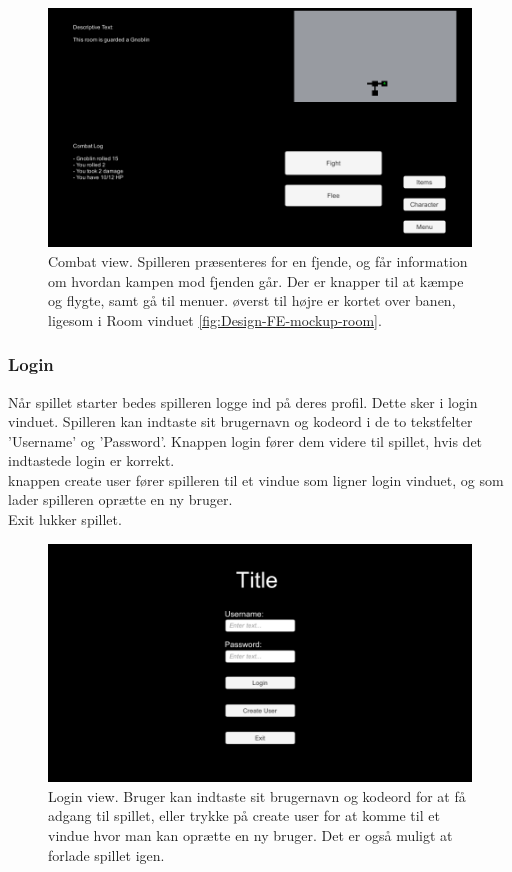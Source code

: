\begin{figure}[h]
\centering
\includegraphics[width = \textwidth]{02-Body/Images/CombatMockup.PNG}
\caption{Combat view. Spilleren præsenteres for en fjende, og får information om hvordan kampen mod fjenden går. Der er knapper til at kæmpe og flygte, samt gå til menuer. øverst til højre er kortet over banen, ligesom i Room vinduet \autoref{fig:Design-FE-mockup-room}.}
\label{fig:Design-FE-mockup-combat}
\end{figure}


\subsubsection{Login}

Når spillet starter bedes spilleren logge ind på deres profil. Dette sker i login vinduet. Spilleren kan indtaste sit brugernavn og kodeord i de to tekstfelter 'Username' og 'Password'. Knappen login fører dem videre til spillet, hvis det indtastede login er korrekt.\\
knappen create user fører spilleren til et vindue som ligner login vinduet, og som lader spilleren oprætte en ny bruger.\\
Exit lukker spillet.

\begin{figure}[h]
\centering
\includegraphics[width = \textwidth]{02-Body/Images/LoginMockup.PNG}
\caption{Login view. Bruger kan indtaste sit brugernavn og kodeord for at få adgang til spillet, eller trykke på create user for at komme til et vindue hvor man kan oprætte en ny bruger. Det er også muligt at forlade spillet igen.}
\label{fig:Design-FE-mockup-login}
\end{figure}

